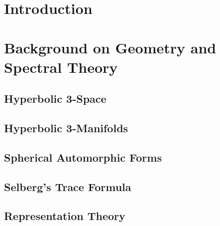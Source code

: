 \documentclass[12pt]{report}
\theoremstyle{definition}
\begin{document}
\pagestyle{plain} %
\setcounter{page}{1}
\doublespacing

\chapter{Introduction} \label{Intro}



\clearpage

\thispagestyle{empty}
\clearpage


\chapter{Background on Geometry and Spectral Theory}\label{background-sec}


\section{Hyperbolic 3-Space} \label{Hyperbolic}




\section{Hyperbolic 3-Manifolds} \label{HyperbolicManifolds}



\section{Spherical Automorphic Forms}\label{SphericalForms}



\section{Selberg's Trace Formula}







\section{Representation Theory}
\end{document}
